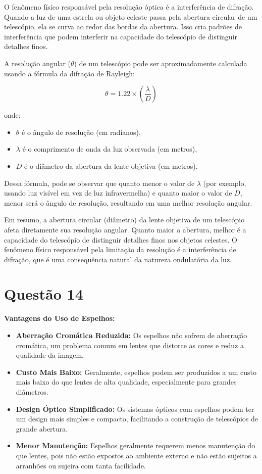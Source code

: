 \documentclass[a4paper, 12pt]{article}
\begin{document}
O fenômeno físico responsável pela resolução óptica é a interferência de difração. Quando a luz de uma estrela ou objeto celeste passa pela abertura circular de um telescópio, ela se curva ao redor das bordas da abertura. Isso cria padrões de interferência que podem interferir na capacidade do telescópio de distinguir detalhes finos.

A resolução angular (\(\theta\)) de um telescópio pode ser aproximadamente calculada usando a fórmula da difração de Rayleigh:

\[
\theta = 1.22 \times \left( \frac{\lambda}{D} \right)
\]

onde:
\begin{itemize}
    \item \( \theta \) é o ângulo de resolução (em radianos),
    \item \( \lambda \) é o comprimento de onda da luz observada (em metros),
    \item \( D \) é o diâmetro da abertura da lente objetiva (em metros).
\end{itemize}

Dessa fórmula, pode se observar que quanto menor o valor de \( \lambda \) (por exemplo, usando luz visível em vez de luz infravermelha) e quanto maior o valor de \( D \), menor será o ângulo de resolução, resultando em uma melhor resolução angular.

Em resumo, a abertura circular (diâmetro) da lente objetiva de um telescópio afeta diretamente sua resolução angular. Quanto maior a abertura, melhor é a capacidade do telescópio de distinguir detalhes finos nos objetos celestes. O fenômeno físico responsável pela limitação da resolução é a interferência de difração, que é uma consequência natural da natureza ondulatória da luz.

\section*{Questão 14}
\textbf{Vantagens do Uso de Espelhos:}
\begin{itemize}
    \item \textbf{Aberração Cromática Reduzida:} Os espelhos não sofrem de aberração cromática, um problema comum em lentes que distorce as cores e reduz a qualidade da imagem.
    \item \textbf{Custo Mais Baixo:} Geralmente, espelhos podem ser produzidos a um custo mais baixo do que lentes de alta qualidade, especialmente para grandes diâmetros.
    \item \textbf{Design Óptico Simplificado:} Os sistemas ópticos com espelhos podem ter um design mais simples e compacto, facilitando a construção de telescópios de grande abertura.
    \item \textbf{Menor Manutenção:} Espelhos geralmente requerem menos manutenção do que lentes, pois não estão expostos ao ambiente externo e não estão sujeitos a arranhões ou sujeira com tanta facilidade.
\end{itemize}
\end{document}
